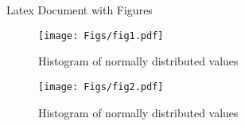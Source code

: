 \documentclass[12pt]{article}
\begin{document}
\huge{Latex Document with Figures}
\begin{figure}[!p]
\centering\texttt{[image: Figs/fig1.pdf]}
\caption{Histogram of normally distributed values}
\label{Fig1}
\end{figure}

\begin{figure}[!p]
    \centering\texttt{[image: Figs/fig2.pdf]}
    \caption{Histogram of normally distributed values}
    \label{Fig1}
    \end{figure}
\end{document}
